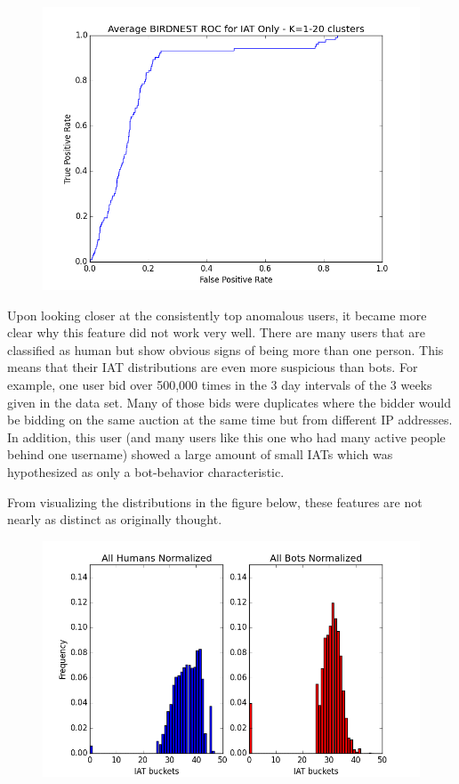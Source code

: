 \documentclass{article} %
\begin{document}
\begin{figure}[h]
\centering
{\includegraphics[scale=0.47]{img/bird_iat_roc.png}}
\end{figure}

Upon looking closer at the consistently top anomalous users, it became more clear why this feature did not work very well.
There are many users that are classified as human but show obvious signs of being more than one person.
This means that their IAT distributions are even more suspicious than bots.
For example, one user bid over 500,000 times in the 3 day intervals of the 3 weeks given in the data set.
Many of those bids were duplicates where the bidder would be bidding on the same auction at the same time but from different IP addresses.
In addition, this user (and many users like this one who had many active people behind one username) showed a large amount of small IATs which was hypothesized as only a bot-behavior characteristic.

From visualizing the distributions in the figure below, these features are not nearly as distinct as originally thought.

\clearpage

\begin{figure}[h]
\centering
{\includegraphics[scale=0.5]{img/bird_iat_dist.png}}
\end{figure}
\end{document}
